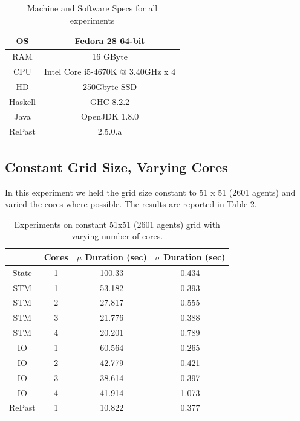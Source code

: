 \begin{table}
	\centering
	\begin{tabular}{ c || c }
		OS & Fedora 28 64-bit \\ \hline
		RAM & 16 GByte \\ \hline
		CPU & Intel Core i5-4670K @ 3.40GHz x 4 \\ \hline
		HD & 250Gbyte SSD \\ \hline
		Haskell & GHC 8.2.2 \\ \hline
		Java & OpenJDK 1.8.0 \\ \hline
		RePast & 2.5.0.a
	\end{tabular}
	
	\caption{Machine and Software Specs for all experiments}
	\label{tab:machine_specs}
\end{table}

\subsection{Constant Grid Size, Varying Cores}
In this experiment we held the grid size constant to 51 x 51 (2601 agents) and varied the cores where possible. The results are reported in Table \ref{tab:constgrid_varyingcores}.

\begin{table}
	\centering
  	\begin{tabular}{ c || c | c | c }
               & Cores & $\mu$ Duration (sec) & $\sigma$ Duration (sec) \\ \hline \hline 
    	State  & 1     & 100.33               & 0.434 \\ \hline \hline
   		STM    & 1     & 53.182               & 0.393 \\ \hline
   		STM    & 2     & 27.817               & 0.555 \\ \hline
   		STM    & 3     & 21.776               & 0.388 \\ \hline
   		STM    & 4     & 20.201               & 0.789 \\ \hline \hline
   		IO     & 1     & 60.564               & 0.265 \\ \hline 
   		IO     & 2     & 42.779               & 0.421 \\ \hline 
   		IO     & 3     & 38.614               & 0.397 \\ \hline 
   		IO     & 4     & 41.914               & 1.073 \\ \hline \hline
   		RePast & 1     & 10.822               & 0.377 \\ \hline 
  	\end{tabular}
  	
  	\caption{Experiments on constant 51x51 (2601 agents) grid with varying number of cores.}
	\label{tab:constgrid_varyingcores}
\end{table}

